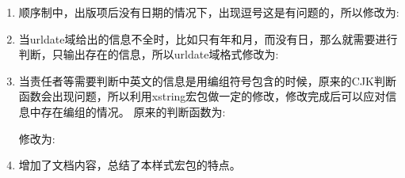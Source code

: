 \begin{enumerate}
\item 顺序制中，出版项后没有日期的情况下，出现逗号这是有问题的，所以修改为:
\begin{texlist}
\end{texlist}

\item 当urldate域给出的信息不全时，比如只有年和月，而没有日，那么就需要进行判断，只输出存在的信息，所以urldate域格式修改为:
\begin{texlist}
\end{texlist}

\item 当责任者等需要判断中英文的信息是用编组符号包含的时候，原来的CJK判断函数会出现问题，所以利用xstring宏包做一定的修改，修改完成后可以应对信息中存在编组的情况。
    原来的判断函数为:
\begin{texlist}
\def\testCJKfirstchar#1#2&{%
\ifnumgreater{`#1}{"2E7F}{\toggletrue{ifCJKforgbt}}{\togglefalse{ifCJKforgbt}}}%
\def\testCJKfirst#1{%
\edef\tempa{#1}%
\expandafter\testCJKfirstchar\tempa&}
\end{texlist}

    修改为:
\begin{texlist}
\def\testCJKfirstchar#1#2&{%
\ifnumgreater{`#1}{"2E7F}{\toggletrue{ifCJKforgbt}}{\togglefalse{ifCJKforgbt}}%
}%

\def\testCJKfirst#1{%
\exploregroups%
\StrChar{#1}{1}[\tempa]%
\expandafter\testCJKfirstchar\tempa&}
\end{texlist}

\item 增加了文档内容，总结了本样式宏包的特点。
\end{enumerate}

